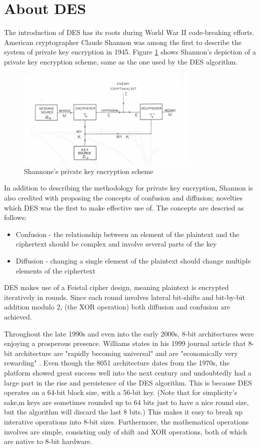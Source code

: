 \documentclass[conference]{IEEEtran}
\begin{document}
\section{About DES}
The introduction of DES has its roots during World War II code-breaking efforts. American cryptographer Claude Shannon was among the first to describe the system of private key encryption in 1945. Figure \ref{fig:shannon_private_key} shows Shannon's depiction of a private key encryption scheme, same as the one used by the DES algorithm. 
\begin{figure}[ht]
	\centering
  \includegraphics[width=3.4in]{shannon_private_key.png}
  \caption{Shannone's private key encryption scheme\cite{shannon}}
  \label{fig:shannon_private_key}
\end{figure}
In addition to describing the methodology for private key encryption, Shannon is also credited with proposing the concepts of confusion and diffusion; novelties which DES was the first to make effective use of\cite{shannon}. The concepts are descried as follows:
\begin{itemize}
  \item Confusion - the  relationship between an element of the plaintext and the ciphertext should be complex and involve several parts of the key
  \item Diffusion - changing a single element of the plaintext should change multiple elements of the ciphertext
\end{itemize}
DES makes use of a Feistal cipher design, meaning plaintext is encrypted iteratively in rounds. Since each round involves lateral bit-shifts and bit-by-bit addition modulo 2, (the XOR operation) both diffusion and confusion are achieved.

Throughout the late 1990s and even into the early 2000s, 8-bit architectures were enjoying a prosperous presence. Williams states in his 1999 journal article that 8-bit architecture are "rapidly becoming universal" and are "economically very rewarding" \cite{8_bit_alive}. Even though the 8051 architecture dates from the 1970s, the platform showed great success well into the next century and undoubtedly had a large part in the rise and persistence of the DES algorithm. This is because DES operates on a 64-bit block size, with a 56-bit key. (Note that for simplicity's sake,m keys are sometimes rounded up to 64 bits just to have a nice round size, but the algorithm will discard the last 8 bits.) This makes it easy to break up interative operations into 8-bit sizes. Furthermore, the mathematical operations involves are simple, consisting only of shift and XOR operations, both of which are native to 8-bit hardware.
\end{document}
